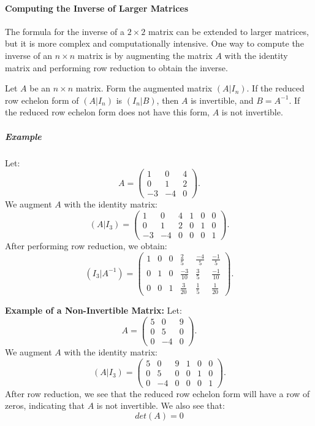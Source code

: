 \documentclass[a4paper,12pt]{article}
\begin{document}
\paragraph{Computing the Inverse of Larger Matrices}

The formula for the inverse of a \( 2 \times 2 \) matrix can be extended to larger matrices, but it is more complex and computationally intensive. One way to compute the inverse of an \( n \times n \) matrix is by augmenting the matrix \( A \) with the identity matrix and performing row reduction to obtain the inverse.
\begin{tcolorbox}[title=Theorem,colframe=blue!70!black, colback=blue!5!white]
Let \( A \) be an \( n \times n \) matrix. Form the augmented matrix \( (A | I_n) \). If the reduced row echelon form of \( (A | I_n) \) is \( (I_n | B) \), then \( A \) is invertible, and \( B = A^{-1} \). If the reduced row echelon form does not have this form, \( A \) is not invertible.
\end{tcolorbox}


\subparagraph{Example} Let:
\[
A = \begin{pmatrix} 1 & 0 & 4 \\ 0 & 1 & 2 \\ -3 & -4 & 0 \end{pmatrix}.
\]
We augment \( A \) with the identity matrix:
\[
(A | I_3) = \begin{pmatrix} 1 & 0 & 4 & 1 & 0 & 0 \\ 0 & 1 & 2 & 0 & 1 & 0 \\ -3 & -4 & 0 & 0 & 0 & 1 \end{pmatrix}.
\]
After performing row reduction, we obtain:
\[
(I_3|A^{-1}) = \begin{pmatrix} 1 & 0 & 0& \frac{2}{5} & \frac{-4}{5} & \frac{-1}{5} \\
0&1&0& \frac{-3}{10} & \frac{3}{5} & \frac{-1}{10} \\
0&0&1&\frac{3}{20} & \frac{1}{5} & \frac{1}{20} 
\end{pmatrix}.
\]

\textbf{Example of a Non-Invertible Matrix:} Let:
\[
A = \begin{pmatrix} 5 & 0 & 9 \\ 0 & 5 & 0 \\ 0 & -4 & 0 \end{pmatrix}.
\]
We augment \( A \) with the identity matrix:
\[
(A | I_3) = \begin{pmatrix} 5 & 0 & 9 & 1 & 0 & 0 \\ 0 & 5 & 0 & 0 & 1 & 0 \\ 0 & -4 & 0 & 0 & 0 & 1 \end{pmatrix}.
\]
After row reduction, we see that the reduced row echelon form will have a row of zeros, indicating that \( A \) is not invertible.
We also see that:
\[
det(A) = 0
\]
\end{document}
